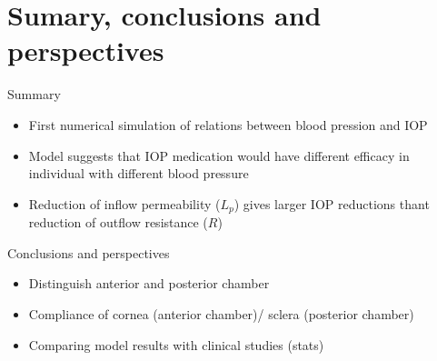 \section{Sumary, conclusions and perspectives}
\begin{frame}{Summary}
\begin{itemize}
\item First numerical simulation of relations between blood pression and IOP
\item Model suggests that IOP medication would have different efficacy in individual with different blood pressure
\item Reduction of inflow permeability ($L_p$) gives larger IOP reductions thant reduction of outflow resistance ($R$)
\end{itemize}
\end{frame}
\begin{frame}{Conclusions and perspectives}
\begin{itemize}
\item Distinguish anterior and posterior chamber

\item Compliance of cornea (anterior chamber)/ sclera (posterior chamber)

\item<2> Comparing model results with clinical studies (stats)
\end{itemize}


\end{frame}
